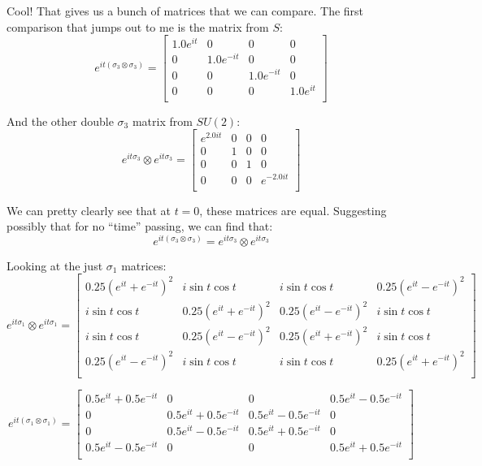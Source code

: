 \documentclass{article}
\begin{document}
Cool! That gives us a bunch of matrices that we can compare. The first comparison that jumps out to me is the matrix from $S$: 
\[ e^{it(\sigma_3 \otimes \sigma_3)} = \left[
    \begin{array}{cccc}
    1.0e^{it} & 0 & 0 & 0 \\
    0 & 1.0e^{-it} & 0 & 0 \\
    0 & 0 & 1.0e^{-it} & 0 \\
    0 & 0 & 0 & 1.0e^{it} \\
    \end{array}
    \right] \]

And the other double $\sigma_3$ matrix from $SU(2)$:
\[ e^{it\sigma_3} \otimes e^{it\sigma_3} =  \left[
    \begin{array}{cccc}
    e^{2.0it} & 0 & 0 & 0 \\
    0 & 1 & 0 & 0 \\
    0 & 0 & 1 & 0 \\
    0 & 0 & 0 & e^{-2.0it} \\
    \end{array}
    \right] \]

We can pretty clearly see that at $t=0$, these matrices are equal. Suggesting possibly that for no ``time'' passing, we can find that: 
\[ e^{it(\sigma_3 \otimes \sigma_3)} = e^{it\sigma_3} \otimes e^{it\sigma_3} \]

Looking at the just $\sigma_1$ matrices: 
\[ e^{it\sigma_1} \otimes e^{it\sigma_1} = \left[
    \begin{array}{cccc}
    0.25(e^{it} + e^{-it})^2 & i\sin{t}\cos{t} & i\sin{t}\cos{t} & 0.25(e^{it} - e^{-it})^2 \\
    i\sin{t}\cos{t} & 0.25(e^{it} + e^{-it})^2 & 0.25(e^{it} - e^{-it})^2 & i\sin{t}\cos{t} \\
    i\sin{t}\cos{t} & 0.25(e^{it} - e^{-it})^2 & 0.25(e^{it} + e^{-it})^2 & i\sin{t}\cos{t} \\
    0.25(e^{it} - e^{-it})^2 & i\sin{t}\cos{t} & i\sin{t}\cos{t} & 0.25(e^{it} + e^{-it})^2 \\
    \end{array}
    \right]  \]

    \[ e^{it(\sigma_1 \otimes \sigma_1)} = \left[
        \begin{array}{cccc}
        0.5e^{it} + 0.5e^{-it} & 0 & 0 & 0.5e^{it} - 0.5e^{-it} \\
        0 & 0.5e^{it} + 0.5e^{-it} & 0.5e^{it} - 0.5e^{-it} & 0 \\
        0 & 0.5e^{it} - 0.5e^{-it} & 0.5e^{it} + 0.5e^{-it} & 0 \\
        0.5e^{it} - 0.5e^{-it} & 0 & 0 & 0.5e^{it} + 0.5e^{-it} \\
        \end{array}
        \right] \]
\end{document}
